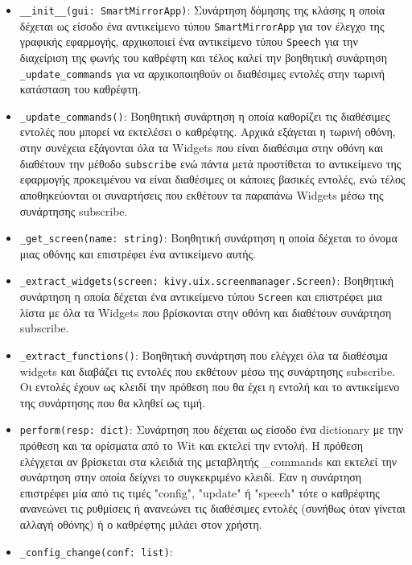 \begin{itemize}
    \item \texttt{\_\_init\_\_(gui: SmartMirrorApp)}: Συνάρτηση δόμησης της κλάσης η οποία δέχεται ως είσοδο ένα αντικείμενο τύπου \texttt{SmartMirrorApp} για τον έλεγχο της γραφικής εφαρμογής, αρχικοποιεί ένα αντικείμενο τύπου \texttt{Speech} για την διαχείριση της φωνής του καθρέφτη και τέλος καλεί την βοηθητική συνάρτηση \texttt{\_update\_commands} για να αρχικοποιηθούν οι διαθέσιμες εντολές στην τωρινή κατάσταση του καθρέφτη.
    \item \texttt{\_update\_commands()}: Βοηθητική συνάρτηση η οποία καθορίζει τις διαθέσιμες εντολές που μπορεί να εκτελέσει ο καθρέφτης. Αρχικά εξάγεται η τωρινή οθόνη, στην συνέχεια εξάγονται όλα τα Widgets που είναι διαθέσιμα στην οθόνη και διαθέτουν την μέθοδο \texttt{subscribe} ενώ πάντα μετά προστίθεται το αντικείμενο της εφαρμογής προκειμένου να είναι διαθέσιμες οι κάποιες βασικές εντολές, ενώ τέλος αποθηκεύονται οι συναρτήσεις που εκθέτουν τα παραπάνω Widgets μέσω της συνάρτησης subscribe.
    \item \texttt{\_get\_screen(name: string)}: Βοηθητική συνάρτηση η οποία δέχεται το όνομα μιας οθόνης και επιστρέφει ένα αντικείμενο αυτής.
    \item \texttt{\_extract\_widgets(screen: kivy.uix.screenmanager.Screen)}: Βοηθητική συνάρτηση η οποία δέχεται ένα αντικείμενο τύπου \texttt{Screen} και επιστρέφει μια λίστα με όλα τα Widgets που βρίσκονται στην οθόνη και διαθέτουν συνάρτηση subscribe.
    \item \texttt{\_extract\_functions()}: Βοηθητική συνάρτηση που ελέγχει όλα τα διαθέσιμα widgets και διαβάζει τις εντολές που εκθέτουν μέσω της συνάρτησης subscribe. Οι εντολές έχουν ως κλειδί την πρόθεση που θα έχει η εντολή και το αντικείμενο της συνάρτησης που θα κληθεί ως τιμή.
    \item \texttt{perform(resp: dict)}: Συνάρτηση που δέχεται ως είσοδο ένα dictionary με την πρόθεση και τα ορίσματα από το Wit και εκτελεί την εντολή. Η πρόθεση ελέγχεται αν βρίσκεται στα κλειδιά της μεταβλητής \_commands και εκτελεί την συνάρτηση στην οποία δείχνει το συγκεκριμένο κλειδί. Εαν η συνάρτηση επιστρέφει μία από τις τιμές "config", "update" ή "speech" τότε ο καθρέφτης ανανεώνει τις ρυθμίσεις ή ανανεώνει τις διαθέσιμες εντολές (συνήθως όταν γίνεται αλλαγή οθόνης) ή ο καθρέφτης μιλάει στον χρήστη.
    \item \texttt{\_config\_change(conf: list)}:
\end{itemize}